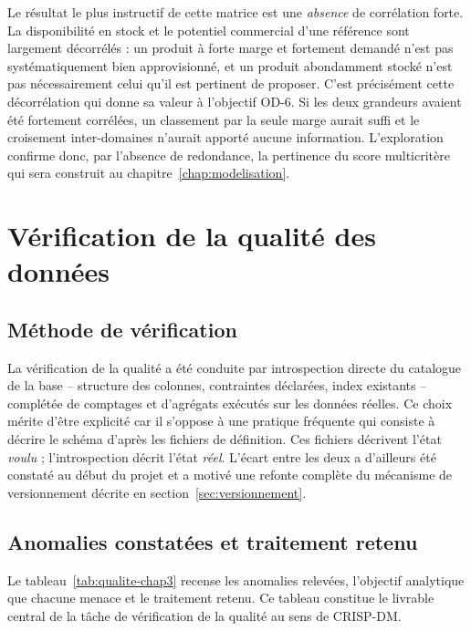 Le résultat le plus instructif de cette matrice est une \textit{absence} de corrélation forte. La disponibilité en stock et le potentiel commercial d'une référence sont largement décorrélés : un produit à forte marge et fortement demandé n'est pas systématiquement bien approvisionné, et un produit abondamment stocké n'est pas nécessairement celui qu'il est pertinent de proposer. C'est précisément cette décorrélation qui donne sa valeur à l'objectif OD-6. Si les deux grandeurs avaient été fortement corrélées, un classement par la seule marge aurait suffi et le croisement inter-domaines n'aurait apporté aucune information. L'exploration confirme donc, par l'absence de redondance, la pertinence du score multicritère qui sera construit au chapitre~\ref{chap:modelisation}.

\section{Vérification de la qualité des données}
\label{sec:qualite}

\subsection{Méthode de vérification}

La vérification de la qualité a été conduite par introspection directe du catalogue de la base -- structure des colonnes, contraintes déclarées, index existants -- complétée de comptages et d'agrégats exécutés sur les données réelles. Ce choix mérite d'être explicité car il s'oppose à une pratique fréquente qui consiste à décrire le schéma d'après les fichiers de définition. Ces fichiers décrivent l'état \textit{voulu} ; l'introspection décrit l'état \textit{réel}. L'écart entre les deux a d'ailleurs été constaté au début du projet et a motivé une refonte complète du mécanisme de versionnement décrite en section~\ref{sec:versionnement}.

\subsection{Anomalies constatées et traitement retenu}

Le tableau~\ref{tab:qualite-chap3} recense les anomalies relevées, l'objectif analytique que chacune menace et le traitement retenu. Ce tableau constitue le livrable central de la tâche de vérification de la qualité au sens de CRISP-DM.

